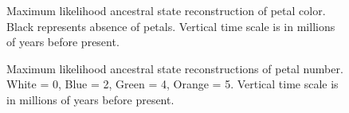 \documentclass[review]{elsarticle}
\begin{document}
\begin{figure}[p]
    \vspace*{-2cm}
    \caption{
      Maximum likelihood ancestral state reconstruction of petal color.
      Black represents absence of petals. Vertical time scale is in millions of years before present.
    }
    \label{petal_color}
\end{figure}

\begin{figure}[p]
    \vspace*{-2cm}
    \caption{
    Maximum likelihood ancestral state reconstructions of petal number. 
    White = 0, Blue = 2, Green = 4, Orange = 5. Vertical time scale is in millions of years before present.
    }
    \label{petal_number}
\end{figure}
\end{document}
